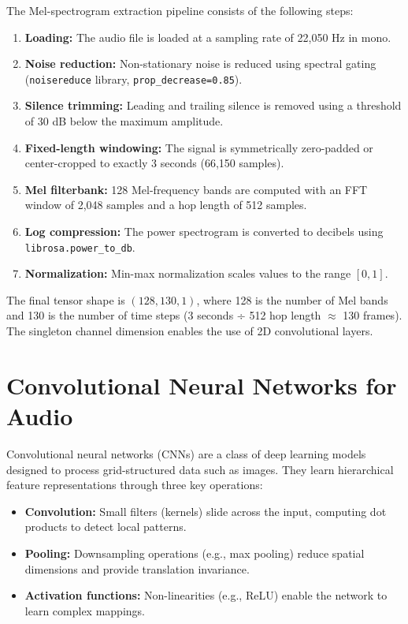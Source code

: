 \documentclass[12pt,a4paper,oneside]{report}
\begin{document}
The Mel-spectrogram extraction pipeline consists of the following steps:
\begin{enumerate}
    \item \textbf{Loading:} The audio file is loaded at a sampling rate of 22,050 Hz in mono.
    \item \textbf{Noise reduction:} Non-stationary noise is reduced using spectral gating (\texttt{noisereduce} library, \texttt{prop\_decrease=0.85}).
    \item \textbf{Silence trimming:} Leading and trailing silence is removed using a threshold of 30 dB below the maximum amplitude.
    \item \textbf{Fixed-length windowing:} The signal is symmetrically zero-padded or center-cropped to exactly 3 seconds (66,150 samples).
    \item \textbf{Mel filterbank:} 128 Mel-frequency bands are computed with an FFT window of 2,048 samples and a hop length of 512 samples.
    \item \textbf{Log compression:} The power spectrogram is converted to decibels using \texttt{librosa.power\_to\_db}.
    \item \textbf{Normalization:} Min-max normalization scales values to the range \([0, 1]\).
\end{enumerate}

The final tensor shape is \((128, 130, 1)\), where 128 is the number of Mel bands and 130 is the number of time steps (3 seconds ÷ 512 hop length \(\approx\) 130 frames). The singleton channel dimension enables the use of 2D convolutional layers.

\section{Convolutional Neural Networks for Audio}

Convolutional neural networks (CNNs) are a class of deep learning models designed to process grid-structured data such as images. They learn hierarchical feature representations through three key operations:
\begin{itemize}
    \item \textbf{Convolution:} Small filters (kernels) slide across the input, computing dot products to detect local patterns.
    \item \textbf{Pooling:} Downsampling operations (e.g., max pooling) reduce spatial dimensions and provide translation invariance.
    \item \textbf{Activation functions:} Non-linearities (e.g., ReLU) enable the network to learn complex mappings.
\end{itemize}
\end{document}

